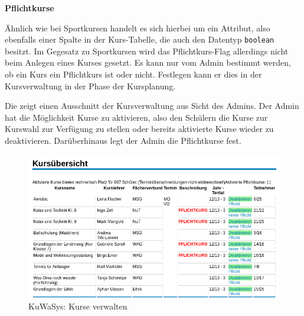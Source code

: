 \textbf{Pflichtkurse}

Ähnlich wie bei Sportkursen handelt es sich hierbei um ein Attribut, also ebenfalls einer Spalte in der Kurs-Tabelle, die auch den Datentyp \texttt{boolean} besitzt.
Im Gegesatz zu Sportkursen wird das Pflichtkurs-Flag allerdings nicht beim Anlegen eines Kurses gesetzt. Es kann nur vom Admin bestimmt werden, ob ein Kurs ein Pflichtkurs ist oder nicht. Festlegen kann er dies in der Kursverwaltung in der Phase der Kursplanung.

Die  zeigt einen Ausschnitt der Kursverwaltung aus Sicht des Admins.
Der Admin hat die Möglichkeit Kurse zu aktivieren, also den Schülern die Kurse zur Kurswahl zur Verfügung zu stellen oder bereits aktivierte Kurse wieder zu deaktivieren.
Darüberhinaus legt der Admin die Pflichtkurse fest.

\begin{figure}[H]
 \begin{center}
   \includegraphics[scale=0.6]{img/KursVerwalten_KuWaSys.png}
 \end{center}
 \caption[\textbf{KuWaSys: Kurse verwalten}]{KuWaSys: Kurse verwalten}
 \label{fig:KursVerwalten_KuWaSys}
\end{figure}
